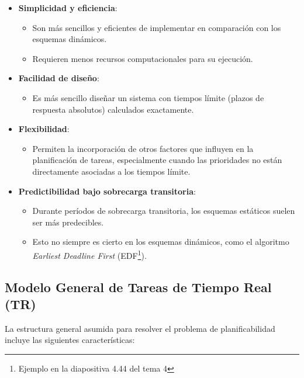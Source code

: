 \documentclass[a4paper,12pt]{article}
\begin{document}
\begin{itemize}
    \item \textbf{Simplicidad y eficiencia}: 
    \begin{itemize}
        \item Son más sencillos y eficientes de implementar en comparación con los esquemas dinámicos.
        \item Requieren menos recursos computacionales para su ejecución.
    \end{itemize}
    \item \textbf{Facilidad de diseño}: 
    \begin{itemize}
        \item Es más sencillo diseñar un sistema con tiempos límite (plazos de respuesta absolutos) calculados exactamente.
    \end{itemize}
    \item \textbf{Flexibilidad}: 
    \begin{itemize}
        \item Permiten la incorporación de otros factores que influyen en la planificación de tareas, especialmente cuando las prioridades no están directamente asociadas a los tiempos límite.
    \end{itemize}
    \item \textbf{Predictibilidad bajo sobrecarga transitoria}:
    \begin{itemize}
        \item Durante períodos de sobrecarga transitoria, los esquemas estáticos suelen ser más predecibles.
        \item Esto no siempre es cierto en los esquemas dinámicos, como el algoritmo \textit{Earliest Deadline First} (EDF\footnote{Ejemplo en la diapositiva 4.44 del tema 4}).
    \end{itemize}
\end{itemize}

\subsection{Modelo General de Tareas de Tiempo Real (TR)}

La estructura general asumida para resolver el problema de planificabilidad incluye las siguientes características:
\end{document}
